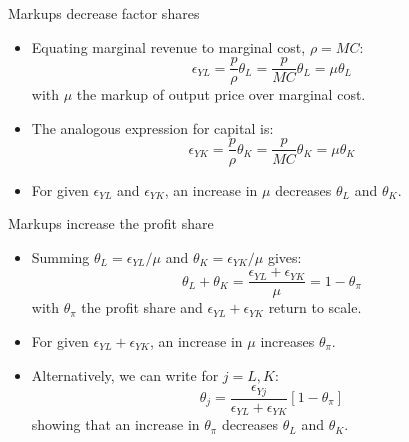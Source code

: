 \documentclass[notes=show]{beamer}
\begin{document}
\begin{frame}{Markups decrease factor shares}
\begin{itemize}
\item Equating marginal revenue to marginal cost, $\rho = MC$:
\begin{equation*}
    \epsilon_{YL} = \frac{p}{\rho} \theta_{L}  = \frac{p}{MC} \theta_{L} = \mu \theta_{L} \tag{4}
\end{equation*}
with $  \mu $ the markup of output price over marginal cost. \medskip
\item The analogous expression for capital is:
\begin{equation*}
    \epsilon_{YK} = \frac{p}{\rho} \theta_{K} = \frac{p}{MC} \theta_{K} = \mu \theta_{K}
\end{equation*}
\item For given $\epsilon_{YL} $ and $\epsilon_{YK} $, an increase in $\mu$ decreases $\theta_{L} $ and $\theta_{K} $.
\end{itemize}
\end{frame}

\begin{frame}{Markups increase the profit share}
\begin{itemize}
\item Summing $ \theta_{L} = \epsilon_{YL} / \mu $ and $ \theta_{K} = \epsilon_{YK} / \mu  $ gives:
\begin{equation*}
    \theta_{L} + \theta_{K}  = \frac{\epsilon_{YL} + \epsilon_{YK}}{\mu} = 1 - \theta_{\pi} \tag{5}
\end{equation*}
with $\theta_{\pi} $ the profit share and $\epsilon_{YL} + \epsilon_{YK} $ return to scale. \medskip
\item For given $ \epsilon_{YL} + \epsilon_{YK}$, an increase in $  \mu $ increases $ \theta_{\pi}$. \medskip
\item Alternatively, we can write for $j=L,K$:
\begin{equation*}
    \theta_{j} = \frac{\epsilon_{Yj}}{\epsilon_{YL} + \epsilon_{YK}}[1- \theta_{\pi}]  \tag{6}
\end{equation*}
showing that an increase in $\theta_{\pi} $ decreases $\theta_{L} $ and $\theta_{K} $.
\end{itemize}
\end{frame}
\end{document}
